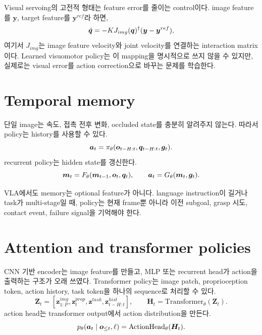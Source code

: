 Visual servoing의 고전적 형태는 feature error를 줄이는 control이다. image feature를 $\bm{y}$, target feature를 $\bm{y}^{ref}$라 하면,
\begin{equation}
  \dot{\bm{q}}
  =
  -K J_{img}(\bm{q})^{\dagger}(\bm{y}-\bm{y}^{ref}),
  \label{eq:visual-servoing}
\end{equation}
여기서 $J_{img}$는 image feature velocity와 joint velocity를 연결하는 interaction matrix이다. Learned visuomotor policy는 이 mapping을 명시적으로 쓰지 않을 수 있지만, 실제로는 visual error를 action correction으로 바꾸는 문제를 학습한다.

\section{Temporal memory}

단일 image는 속도, 접촉 전후 변화, occluded state를 충분히 알려주지 않는다. 따라서 policy는 history를 사용할 수 있다.
\begin{equation}
  \bm{a}_t
  =
  \pi_{\theta}(\bm{o}_{t-H:t},\bm{q}_{t-H:t},\bm{g}_t).
  \label{eq:history-policy}
\end{equation}
recurrent policy는 hidden state를 갱신한다.
\begin{equation}
  \bm{m}_t
  =
  F_{\theta}(\bm{m}_{t-1},\bm{o}_t,\bm{q}_t),
  \qquad
  \bm{a}_t
  =
  G_{\theta}(\bm{m}_t,\bm{g}_t).
  \label{eq:recurrent-visuomotor}
\end{equation}

VLA에서도 memory는 optional feature가 아니다. language instruction이 길거나 task가 multi-stage일 때, policy는 현재 frame뿐 아니라 이전 subgoal, grasp 시도, contact event, failure signal을 기억해야 한다.

\section{Attention and transformer policies}

CNN 기반 encoder는 image feature를 만들고, MLP 또는 recurrent head가 action을 출력하는 구조가 오래 쓰였다. Transformer policy는 image patch, proprioception token, action history, task token을 하나의 sequence로 처리할 수 있다.
\begin{equation}
  \bm{Z}_t
  =
  [\bm{z}^{img}_{1:P},\bm{z}^{prop}_t,\bm{z}^{task},\bm{z}^{hist}_{t-H:t}],
  \qquad
  \bm{H}_t = \mathrm{Transformer}_{\theta}(\bm{Z}_t).
  \label{eq:transformer-policy-tokens}
\end{equation}
action head는 transformer output에서 action distribution을 만든다.
\begin{equation}
  p_{\theta}(\bm{a}_t\mid \bm{o}_{\le t},\ell)
  =
  \mathrm{ActionHead}_{\theta}(\bm{H}_t).
  \label{eq:transformer-action-head}
\end{equation}

